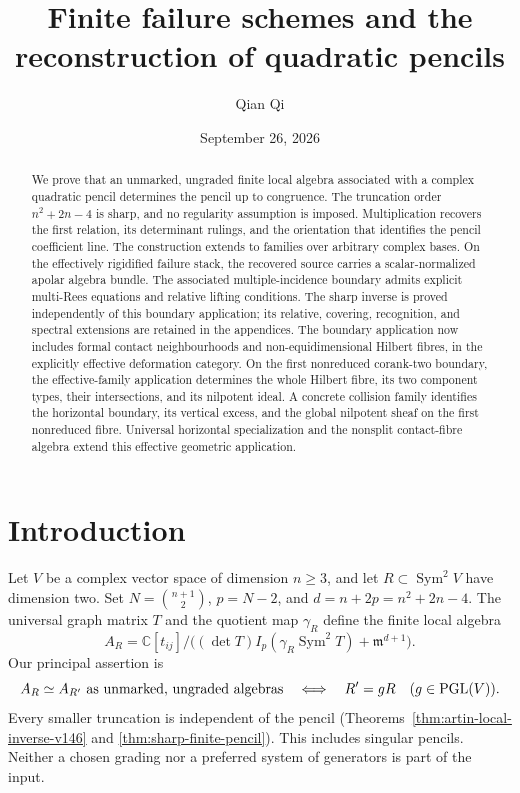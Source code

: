 \documentclass[11pt,reqno]{amsart}
\numberwithin{equation}{section}
\theoremstyle{definition}\newtheorem{definition}[theorem]{Definition}
\theoremstyle{remark}\newtheorem{remark}[theorem]{Remark}
\newcommand{\C}{\mathbb C}\newcommand{\Q}{\mathbb Q}
\DeclareMathOperator{\Sym}{Sym}\DeclareMathOperator{\Gr}{Gr}
\begin{document}
\title{Finite failure schemes and the reconstruction of quadratic pencils}
\author{Qian Qi}
\date{September 26, 2026}
\begin{abstract}
We prove that an unmarked, ungraded finite local algebra associated
with a complex quadratic pencil determines the pencil up to congruence.
The truncation order $n^2+2n-4$ is sharp, and no regularity assumption
is imposed. Multiplication recovers the first relation, its determinant
rulings, and the orientation that identifies the pencil coefficient
line. The construction extends to families over arbitrary complex
bases. On the effectively rigidified failure stack, the recovered
source carries a scalar-normalized apolar algebra bundle. The associated
multiple-incidence boundary admits explicit multi-Rees equations and
relative lifting conditions. The sharp inverse is proved independently
of this boundary application; its relative, covering, recognition,
and spectral extensions are retained in the appendices. The boundary application now includes formal
contact neighbourhoods and non-equidimensional Hilbert fibres, in the
explicitly effective deformation category. On the first nonreduced corank-two boundary,
the effective-family application determines the whole Hilbert fibre,
its two component types, their intersections, and its nilpotent ideal. A concrete collision family identifies the
horizontal boundary, its vertical excess, and the global nilpotent
sheaf on the first nonreduced fibre.
Universal horizontal specialization and the nonsplit contact-fibre
algebra extend this effective geometric application.
\end{abstract}
\maketitle
\section{Introduction}
\label{sec:paper-i-v164}\label{sec:paper-i-v166}
Let $V$ be a complex vector space of dimension $n\geq3$, and let
$R\subset\Sym^2V$ have dimension two. Set $N=\binom{n+1}{2}$,
$p=N-2$, and $d=n+2p=n^2+2n-4$. The universal graph matrix $T$ and
the quotient map $\gamma_R$ define the finite local algebra
\[
 A_R=\C[t_{ij}]/\bigl((\det T)I_p(\gamma_R\Sym^2T)
                                  +\mathfrak m^{d+1}\bigr).
\]
Our principal assertion is
\[
 A_R\simeq A_{R'}\text{ as unmarked, ungraded algebras}
       \quad\Longleftrightarrow\quad R'=gR\quad(g\in\operatorname{PGL}(V)).
\]
Every smaller truncation is independent of the pencil
(Theorems~\ref{thm:artin-local-inverse-v146} and
\ref{thm:sharp-finite-pencil}). This includes singular pencils.
Neither a chosen grading nor a preferred system of generators is
part of the input.
\end{document}
